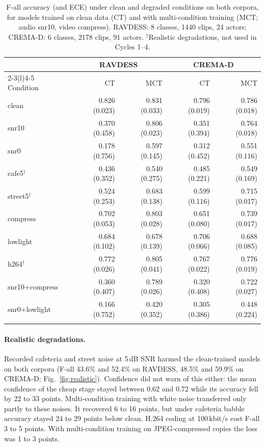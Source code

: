 \begin{table}[t]
\setlength{\tabcolsep}{4pt}
\caption{F-all accuracy (and ECE) under clean and degraded conditions on both corpora, for models trained on clean data (CT) and with multi-condition training (MCT; audio snr10, video compress). RAVDESS: 8 classes, 1440 clips, 24 actors; CREMA-D: 6 classes, 2178 clips, 91 actors. $^\dagger$Realistic degradations, not used in Cycles 1--4.}\label{tab:replication}
\centering\footnotesize
\begin{tabular}{@{}lrrrr@{}}
\toprule
 & \multicolumn{2}{c}{RAVDESS} & \multicolumn{2}{c}{CREMA-D} \\
\cmidrule(lr){2-3}\cmidrule(l){4-5}
Condition & CT & MCT & CT & MCT \\
\midrule
clean & 0.826 (0.023) & 0.831 (0.033) & 0.796 (0.019) & 0.786 (0.018) \\
snr10 & 0.370 (0.458) & 0.806 (0.023) & 0.351 (0.394) & 0.764 (0.018) \\
snr0 & 0.178 (0.756) & 0.597 (0.145) & 0.312 (0.452) & 0.551 (0.116) \\
cafe5$^\dagger$ & 0.436 (0.352) & 0.540 (0.275) & 0.485 (0.221) & 0.549 (0.169) \\
street5$^\dagger$ & 0.524 (0.253) & 0.683 (0.138) & 0.599 (0.116) & 0.715 (0.017) \\
compress & 0.702 (0.053) & 0.803 (0.028) & 0.651 (0.080) & 0.739 (0.017) \\
lowlight & 0.684 (0.102) & 0.678 (0.139) & 0.706 (0.066) & 0.688 (0.085) \\
h264$^\dagger$ & 0.772 (0.026) & 0.805 (0.041) & 0.767 (0.022) & 0.776 (0.019) \\
snr10+compress & 0.360 (0.407) & 0.789 (0.026) & 0.320 (0.408) & 0.722 (0.027) \\
snr0+lowlight & 0.166 (0.752) & 0.420 (0.352) & 0.305 (0.386) & 0.448 (0.224) \\
\botrule
\end{tabular}
\end{table}

\paragraph{Realistic degradations.} Recorded cafeteria and street noise at 5\,dB SNR harmed the clean-trained models on both corpora (F-all 43.6\% and 52.4\% on RAVDESS, 48.5\% and 59.9\% on CREMA-D; Fig.~\ref{fig:realistic}). Confidence did not warn of this either: the mean confidence of the cheap stage stayed between 0.62 and 0.72 while its accuracy fell by 22 to 33 points. Multi-condition training with white noise transferred only partly to these noises. It recovered 6 to 16 points, but under cafeteria babble accuracy stayed 24 to 29 points below clean. H.264 coding at 100\,kbit/s cost F-all 3 to 5 points. With multi-condition training on JPEG-compressed copies the loss was 1 to 3 points.

